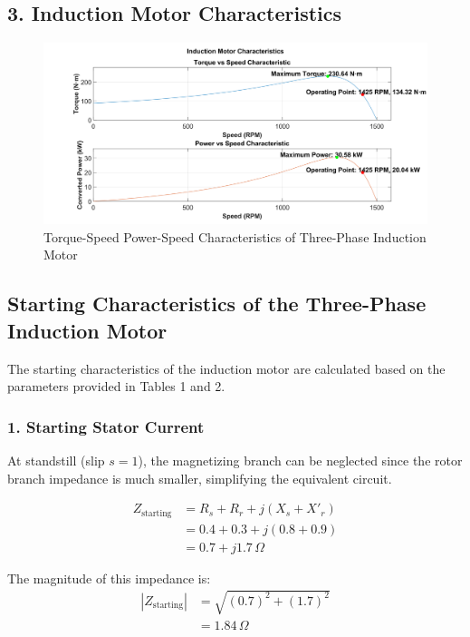 \documentclass[a4paper,12pt]{IEEEtran}
\begin{document}
\newpage
\subsection{3. Induction Motor Characteristics}

\vspace{-10pt}
\begin{figure}[h!]
    \centering
    \includegraphics[width=1.07\textwidth]{correct_motor_characteristic.png}
    \caption{Torque-Speed Power-Speed Characteristics of Three-Phase Induction Motor}
    \label{fig:motor_char}
\end{figure}
 
 
\FloatBarrier

\subsection{Starting Characteristics of the Three-Phase Induction Motor}

The starting characteristics of the induction motor are calculated based on the parameters provided in Tables 1 and 2.

\subsubsection{1. Starting Stator Current}

At standstill (slip $s = 1$), the magnetizing branch can be neglected since the rotor branch impedance is much smaller, simplifying the equivalent circuit.

\begin{align}
    Z_{\text{starting}} &= R_s + R_r + j(X_s + X'_r) \nonumber \\
    &= 0.4 + 0.3 + j(0.8 + 0.9) \nonumber \\
    &= 0.7 + j1.7\,\Omega
\end{align}

The magnitude of this impedance is:
\begin{align}
    |Z_{\text{starting}}| &= \sqrt{(0.7)^2 + (1.7)^2} \nonumber \\
    &= 1.84\,\Omega
\end{align}
\end{document}

